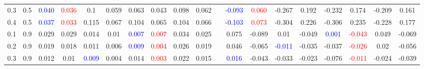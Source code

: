 \documentclass[specialist,
substylefile = spbu_report.rtx,
subf,12pt]{disser}
\theoremstyle{definition}
\begin{document}
\begin{table}
{\begin{tabular}{m{1cm}m{1cm}ccccccccm{0.2cm}cccccccc}
			0.3 & 0.5    & \textcolor{blue}{0.040}                 & \textcolor{red}{0.036}                     & 0.1                                 & 0.059                       & 0.063                   & 0.043                                   & 0.098                                      & 0.062                    &                             & \textcolor{blue}{-0.093} & \textcolor{red}{0.060} & -0.267                   & 0.192      & -0.232                   & 0.174                   & -0.209                   & 0.161                  \\
			0.4 & 0.5    & \textcolor{blue}{0.037}                 & \textcolor{red}{0.033}                     & 0.115                               & 0.067                       & 0.104                   & 0.065                                   & 0.104                                      & 0.066                    &                             & \textcolor{blue}{-0.103} & \textcolor{red}{0.073} & -0.304                   & 0.226      & -0.306                   & 0.235                   & -0.228                   & 0.177                  \\
			\hline
			0.1 & 0.9    & 0.029                                   & 0.029                                      & 0.014                               & 0.01                        & \textcolor{blue}{0.007} & \textcolor{red}{0.007}                  & 0.034                                      & 0.025                    &                             & 0.075                    & -0.089                 & 0.01                     & -0.049     & \textcolor{blue}{0.001}  & \textcolor{red}{-0.043} & 0.049                    & -0.069                 \\
			0.2 & 0.9    & 0.019                                   & 0.018                                      & 0.011                               & 0.006                       & \textcolor{blue}{0.009} & \textcolor{red}{0.004}                  & 0.026                                      & 0.019                    &                             & 0.046                    & -0.065                 & \textcolor{blue}{-0.011} & -0.035     & -0.037                   & \textcolor{red}{-0.026} & 0.02                     & -0.056                 \\
			0.3 & 0.9    & 0.012                                   & 0.01                                       & \textcolor{blue}{0.009}             & 0.004                       & 0.014                   & \textcolor{red}{0.003}                  & 0.022                                      & 0.015                    &                             & \textcolor{blue}{0.016}  & -0.043                 & -0.033                   & -0.023     & -0.076                   & \textcolor{red}{-0.011} & -0.024                   & -0.039                 \\

\end{tabular}}
\end{table}
\end{document}
